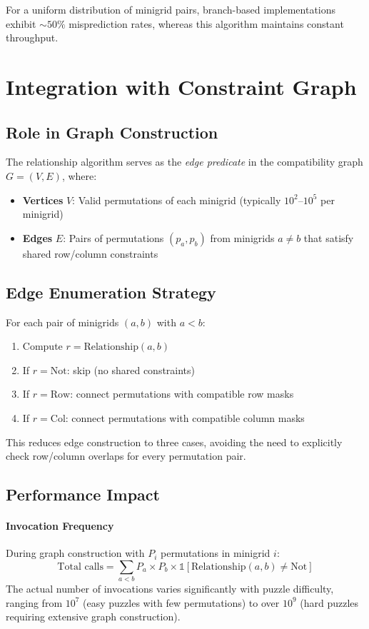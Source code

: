 \documentclass[11pt,a4paper]{article}
\begin{document}
For a uniform distribution of minigrid pairs, branch-based implementations exhibit $\sim 50\%$ misprediction rates, whereas this algorithm maintains constant throughput.

\section{Integration with Constraint Graph}

\subsection{Role in Graph Construction}

The relationship algorithm serves as the \emph{edge predicate} in the compatibility graph $G = (V, E)$, where:
\begin{itemize}
    \item \textbf{Vertices} $V$: Valid permutations of each minigrid (typically $10^2$--$10^5$ per minigrid)
    \item \textbf{Edges} $E$: Pairs of permutations $(p_a, p_b)$ from minigrids $a \neq b$ that satisfy shared row/column constraints
\end{itemize}

\subsection{Edge Enumeration Strategy}

For each pair of minigrids $(a, b)$ with $a < b$:
\begin{enumerate}
    \item Compute $r = \text{Relationship}(a, b)$
    \item If $r = \text{Not}$: skip (no shared constraints)
    \item If $r = \text{Row}$: connect permutations with compatible row masks
    \item If $r = \text{Col}$: connect permutations with compatible column masks
\end{enumerate}

This reduces edge construction to three cases, avoiding the need to explicitly check row/column overlaps for every permutation pair.

\subsection{Performance Impact}

\paragraph{Invocation Frequency}
During graph construction with $P_i$ permutations in minigrid $i$:
\begin{equation}
    \text{Total calls} = \sum_{a < b} P_a \times P_b \times \mathbb{1}[\text{Relationship}(a, b) \neq \text{Not}]
\end{equation}
The actual number of invocations varies significantly with puzzle difficulty, ranging from $10^7$ (easy puzzles with few permutations) to over $10^9$ (hard puzzles requiring extensive graph construction).
\end{document}
